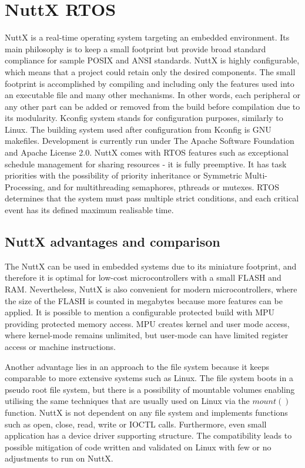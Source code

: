 \documentclass{ctuthesis}
\begin{document}
\chapter{NuttX RTOS}
\label{ch:nuttx}
 NuttX is a real-time operating system targeting an embedded environment. Its main philosophy is to keep a small footprint but provide broad standard compliance for sample POSIX and ANSI standards. NuttX is highly configurable, which means that a project could retain only the desired components. The small footprint is accomplished by compiling and including only the features used into an executable file and many other mechanisms. In other words, each peripheral or any other part can be added or removed from the build before compilation due to its modularity\cite{nuttx_about}. Kconfig system stands for configuration purposes, similarly to Linux. The building system used after configuration from Kconfig is GNU makefiles. Development is currently run under The Apache Software Foundation and Apache License 2.0. NuttX comes with RTOS features such as exceptional schedule management for sharing resources - it is fully preemptive. It has task priorities with the possibility of priority inheritance or Symmetric Multi-Processing, and for multithreading semaphores, pthreads or mutexes. RTOS determines that the system must pass multiple strict conditions, and each critical event has its defined maximum realisable time.

 \section{NuttX advantages and comparison}
  The NuttX can be used in embedded systems due to its miniature footprint, and therefore it is optimal for low-cost microcontrollers with a small FLASH and RAM. Nevertheless, NuttX is also convenient for modern microcontrollers, where the size of the FLASH is counted in megabytes because more features can be applied. It is possible to mention a configurable protected build with MPU providing protected memory access. MPU creates kernel and user mode access, where kernel-mode remains unlimited, but user-mode can have limited register access or machine instructions\cite{nuttx_protected}. \newline
  
  \quad Another advantage lies in an approach to the file system because it keeps comparable to more extensive systems such as Linux. The file system boots in a pseudo root file system, but there is a possibility of mountable volumes enabling utilising the same techniques that are usually used on Linux via the $mount()$ function. NuttX is not dependent on any file system and implements functions such as open, close, read, write or IOCTL calls. Furthermore, even small application has a device driver supporting structure. The compatibility leads to possible mitigation of code written and validated on Linux with few or no adjustments to run on NuttX.  \newline
  
\end{document}
